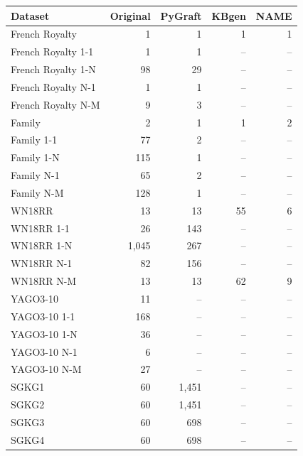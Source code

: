\begin{tabular}{lrrrr}
\toprule
Dataset & Original & PyGraft & KBgen & NAME \\
\midrule
French Royalty & 1 & 1 & 1 & 1 \\
French Royalty 1-1 & 1 & 1 & – & – \\
French Royalty 1-N & 98 & 29 & – & – \\
French Royalty N-1 & 1 & 1 & – & – \\
French Royalty N-M & 9 & 3 & – & – \\
\midrule
Family & 2 & 1 & 1 & 2 \\
Family 1-1 & 77 & 2 & – & – \\
Family 1-N & 115 & 1 & – & – \\
Family N-1 & 65 & 2 & – & – \\
Family N-M & 128 & 1 & – & – \\
\midrule
WN18RR & 13 & 13 & 55 & 6 \\
WN18RR 1-1 & 26 & 143 & – & – \\
WN18RR 1-N & 1{,}045 & 267 & – & – \\
WN18RR N-1 & 82 & 156 & – & – \\
WN18RR N-M & 13 & 13 & 62 & 9 \\
\midrule
YAGO3-10 & 11 & – & – & – \\
YAGO3-10 1-1 & 168 & – & – & – \\
YAGO3-10 1-N & 36 & – & – & – \\
YAGO3-10 N-1 & 6 & – & – & – \\
YAGO3-10 N-M & 27 & – & – & – \\
\midrule
SGKG1 & 60 & 1{,}451 & – & – \\
SGKG2 & 60 & 1{,}451 & – & – \\
SGKG3 & 60 & 698 & – & – \\
SGKG4 & 60 & 698 & – & – \\
\bottomrule
\end{tabular}
